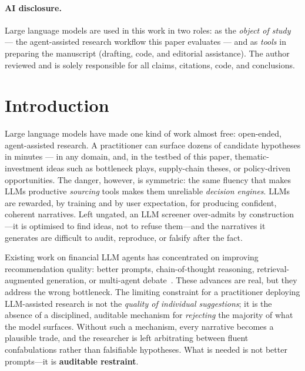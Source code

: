 \documentclass[11pt]{article}
\begin{document}
\paragraph{AI disclosure.} Large language models are used in this work in two roles: as the \emph{object of study} --- the agent-assisted research workflow this paper evaluates --- and as \emph{tools} in preparing the manuscript (drafting, code, and editorial assistance). The author reviewed and is solely responsible for all claims, citations, code, and conclusions.

\section{Introduction}

Large language models have made one kind of work almost free: open-ended, agent-assisted research.
A practitioner can surface dozens of candidate hypotheses in minutes --- in any domain, and, in the
testbed of this paper, thematic-investment ideas such as bottleneck plays, supply-chain theses, or
policy-driven opportunities.
The danger, however, is symmetric: the same fluency that makes LLMs productive \emph{sourcing}
tools makes them unreliable \emph{decision engines}.
LLMs are rewarded, by training and by user expectation, for producing confident, coherent
narratives.
Left ungated, an LLM screener over-admits by construction---it is optimised to find ideas,
not to refuse them---and the narratives it generates are difficult to audit, reproduce, or
falsify after the fact.

Existing work on financial LLM agents has concentrated on improving recommendation quality:
better prompts, chain-of-thought reasoning, retrieval-augmented generation, or multi-agent
debate~\citep{xiao2024tradingagents,du2024multiagentdebate}.
These advances are real, but they address the wrong bottleneck.
The limiting constraint for a practitioner deploying LLM-assisted research is not the
\emph{quality of individual suggestions}; it is the absence of a disciplined, auditable
mechanism for \emph{rejecting} the majority of what the model surfaces.
Without such a mechanism, every narrative becomes a plausible trade, and the researcher
is left arbitrating between fluent confabulations rather than falsifiable hypotheses.
What is needed is not better prompts---it is \textbf{auditable restraint}.
\end{document}
